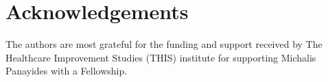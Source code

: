 \section*{Acknowledgements}

The authors are most grateful for the funding and support received by The 
Healthcare Improvement Studies (THIS) institute for supporting Michalis 
Panayides with a Fellowship.